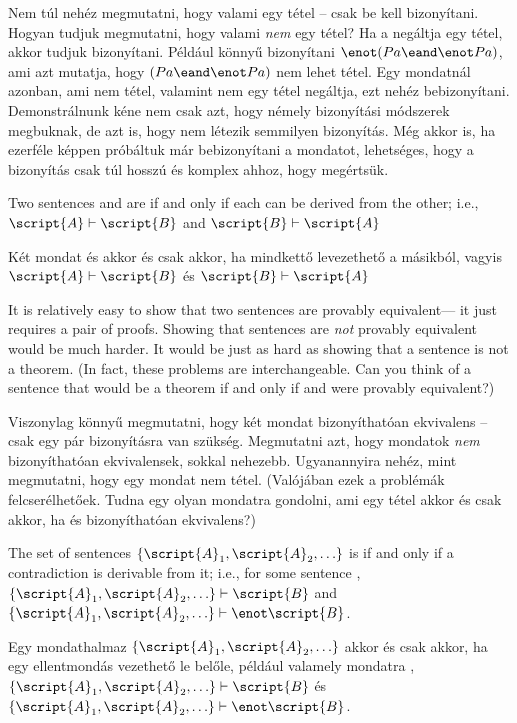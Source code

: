 Nem túl nehéz megmutatni, hogy valami egy tétel -- csak be kell bizonyítani. Hogyan tudjuk megmutatni, hogy valami \emph{nem} egy tétel? Ha a negáltja egy tétel, akkor tudjuk bizonyítani. Például könnyű bizonyítani $\enot(Pa \eand \enot Pa)$, ami azt mutatja, hogy $(Pa \eand \enot Pa)$ nem lehet tétel. Egy mondatnál azonban, ami nem tétel, valamint nem egy tétel negáltja, ezt nehéz bebizonyítani. Demonstrálnunk kéne nem csak azt, hogy némely bizonyítási módszerek megbuknak, de azt is, hogy nem létezik semmilyen bizonyítás. Még akkor is, ha ezerféle képpen próbáltuk már bebizonyítani a mondatot, lehetséges, hogy a bizonyítás csak túl hosszú és komplex ahhoz, hogy megértsük.

Two sentences  and  are  if and only if each can be derived from the other; i.e., $\script{A}\vdash\script{B}$ and $\script{B}\vdash\script{A}$

Két mondat  és   akkor és csak akkor, ha mindkettő levezethető a másikból, vagyis $\script{A}\vdash\script{B}$ és $\script{B}\vdash\script{A}$

It is relatively easy to show that two sentences are provably equivalent--- it just requires a pair of proofs. Showing that sentences are \emph{not} provably equivalent would be much harder. It would be just as hard as showing that a sentence is not a theorem. (In fact, these problems are interchangeable. Can you think of a sentence that would be a theorem if and only if  and  were provably equivalent?)

Viszonylag könnyű megmutatni, hogy két mondat bizonyíthatóan ekvivalens -- csak egy pár bizonyításra van szükség. Megmutatni azt, hogy mondatok \emph{nem} bizonyíthatóan ekvivalensek, sokkal nehezebb. Ugyanannyira nehéz, mint megmutatni, hogy egy mondat nem tétel. (Valójában ezek a problémák felcserélhetőek. Tudna egy olyan mondatra gondolni, ami egy tétel akkor és csak akkor, ha  és  bizonyíthatóan ekvivalens?)

The set of sentences $\{\script{A}_1,\script{A}_2,\ldots\}$ is  if and only if a contradiction is derivable from it; i.e., for some sentence , $\{\script{A}_1,\script{A}_2,\ldots\}\vdash\script{B}$ and $\{\script{A}_1,\script{A}_2,\ldots\}\vdash\enot \script{B}$.

Egy mondathalmaz $\{\script{A}_1,\script{A}_2,\ldots\}$  akkor és csak akkor, ha egy ellentmondás vezethető le belőle, például valamely mondatra , $\{\script{A}_1,\script{A}_2,\ldots\}\vdash\script{B}$ és $\{\script{A}_1,\script{A}_2,\ldots\}\vdash\enot \script{B}$.

